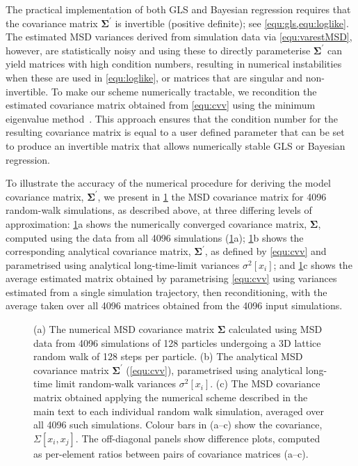 \documentclass[reprint,superscriptaddress,nobibnotes,amsmath,amssymb,aps,prx,hidelinks]{revtex4-2}
\newcommand{\oMSDi}{\ensuremath{x_i}}
\newcommand{\oMSDj}{\ensuremath{x_j}}
\newcommand{\var}[1]{\ensuremath{\sigma^2[#1]}}
\begin{document}
The practical implementation of both GLS and Bayesian regression requires that the covariance matrix $\mathbf{\Sigma^\prime}$ is invertible (positive definite); see \cref{equ:gls,equ:loglike}.
The estimated MSD variances derived from simulation data via \cref{equ:varestMSD}, however, are statistically noisy and using these to directly parameterise $\mathbf{\Sigma^\prime}$ can yield matrices with high condition numbers, resulting in numerical instabilities when these are used in \cref{equ:loglike}, or matrices that are singular and non-invertible.
To make our scheme numerically tractable, we recondition the estimated covariance matrix obtained from \cref{equ:cvv} using the minimum eigenvalue method~\cite{TabeartEtAl_TellusDynMeteorolOceanogr2020}.
This approach ensures that the condition number for the resulting covariance matrix is equal to a user defined parameter that can be set to produce an invertible matrix that allows numerically stable GLS or Bayesian regression.

To illustrate the accuracy of the numerical procedure for deriving the model covariance matrix, $\bm{\Sigma^\prime}$, we present in \cref{fig:covariances} the MSD covariance matrix for \num{4096} random-walk simulations, as described above, at three differing levels of approximation:
\cref{fig:covariances}a shows the numerically converged covariance matrix, $\bm{\Sigma}$, computed using the data from all \num{4096} simulations (\cref{fig:covariances}a); \cref{fig:covariances}b shows the corresponding analytical covariance matrix, $\mathbf{\Sigma^\prime}$, as defined by \cref{equ:cvv} and parametrised using analytical long-time-limit variances $\var{\oMSDi}$; and \cref{fig:covariances}c shows the average estimated matrix obtained by parametrising \cref{equ:cvv} using variances estimated from a single simulation trajectory, then reconditioning, with the average taken over all \num{4096} matrices obtained from the \num{4096} input simulations. 
\begin{figure}
    \centering
    \caption{
        (a) The numerical MSD covariance matrix $\bm{\Sigma}$ calculated using MSD data from \num{4096} simulations of \num{128} particles undergoing a 3D lattice random walk of \num{128} steps per particle.
        (b) The analytical MSD covariance matrix $\bm{\Sigma^\prime}$ (\cref{equ:cvv}), parametrised using analytical long-time limit random-walk variances $\var{\oMSDi}$.
        (c) The MSD covariance matrix obtained applying the numerical scheme described in the main text to each individual random walk simulation, averaged over all \num{4096} such simulations.
        Colour bars in (a--c) show the covariance, $\Sigma\left[\oMSDi, \oMSDj\right]$.
        The off-diagonal panels show difference plots, computed as per-element ratios between pairs of covariance matrices (a--c).
    }
    \label{fig:covariances}
\end{figure}
\end{document}
